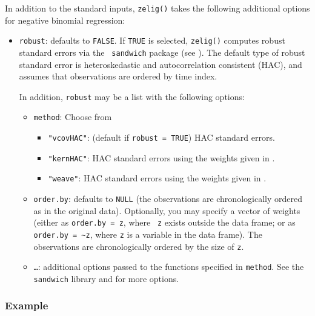 In addition to the standard inputs, {\tt zelig()} takes the following
additional options for negative binomial regression:  
\begin{itemize}
\item {\tt robust}: defaults to {\tt FALSE}.  If {\tt TRUE} is
selected, {\tt zelig()} computes robust standard errors via the {\tt
sandwich} package (see \cite{Zeileis04}).  The default type of robust
standard error is heteroskedastic and autocorrelation consistent (HAC),
and assumes that observations are ordered by time index.

In addition, {\tt robust} may be a list with the following options:  
\begin{itemize}
\item {\tt method}:  Choose from 
\begin{itemize}
\item {\tt "vcovHAC"}: (default if {\tt robust = TRUE}) HAC standard
errors. 
\item {\tt "kernHAC"}: HAC standard errors using the
weights given in \cite{Andrews91}. 
\item {\tt "weave"}: HAC standard errors using the
weights given in \cite{LumHea99}.  
\end{itemize}  
\item {\tt order.by}: defaults to {\tt NULL} (the observations are
chronologically ordered as in the original data).  Optionally, you may
specify a vector of weights (either as {\tt order.by = z}, where {\tt
z} exists outside the data frame; or as {\tt order.by = \~{}z}, where
{\tt z} is a variable in the data frame).  The observations are
chronologically ordered by the size of {\tt z}.
\item {\tt \dots}:  additional options passed to the functions 
specified in {\tt method}.   See the {\tt sandwich} library and
\cite{Zeileis04} for more options.   
\end{itemize}
\end{itemize}

\subsubsection{Example}

